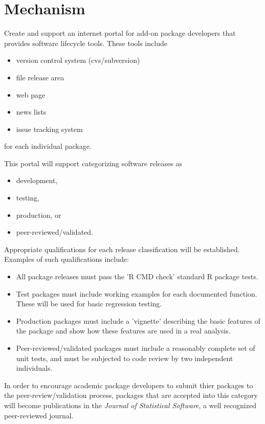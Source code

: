 \documentclass[12pt]{article}
\begin{document}
\section{Mechanism}

Create and support an internet portal for add-on package developers
that provides software lifecycle tools.  These tools include
\begin{itemize}
\item version control system (cvs/subversion)
\item file release area 
\item web page
\item news lists
\item issue tracking system
\end{itemize} for each individual package.

This portal will support categorizing software releases as 
\begin{itemize}
\item development,
\item testing,
\item production, or
\item peer-reviewed/validated.
\end{itemize}

Appropriate qualifications for each release classification will be
established.  Examples of such qualifications include: 
\begin{itemize}
\item All package releases must pass the 'R CMD check'
  standard R package tests.
\item Test packages must include working examples for each documented
  function.  These will be used for basic regression testing.
\item Production packages must include a 'vignette' describing the
  basic features of the package and show how these features are used
  in a real analysis.
\item Peer-reviewed/validated packages must include a reasonably
  complete set of unit tests, and must be subjected to code review by
  two independent individuals.
\end{itemize}

In order to encourage academic package developers to submit thier
packages to the peer-review/validation process, packages that are
accepted into this category will become publications in the
\emph{Journal of Statistical Software}, a well recognized
peer-reviewed journal.
\end{document}
